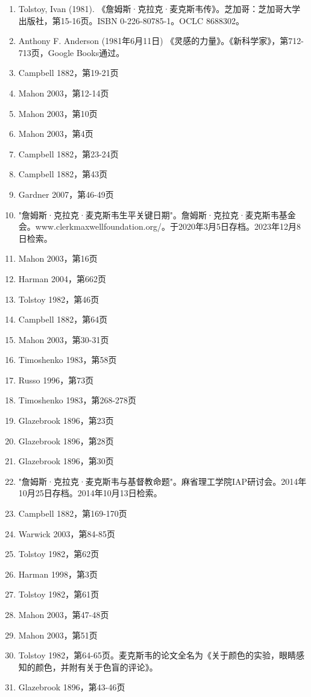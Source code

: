 \begin{enumerate}
\item Tolstoy, Ivan (1981). 《詹姆斯·克拉克·麦克斯韦传》。芝加哥：芝加哥大学出版社，第15-16页。ISBN 0-226-80785-1。OCLC 8688302。  
\item Anthony F. Anderson (1981年6月11日) 《灵感的力量》。《新科学家》，第712-713页，Google Books通过。  
\item Campbell 1882，第19-21页  
\item Mahon 2003，第12-14页  
\item Mahon 2003，第10页  
\item Mahon 2003，第4页  
\item Campbell 1882，第23-24页  
\item Campbell 1882，第43页  
\item Gardner 2007，第46-49页  
\item "詹姆斯·克拉克·麦克斯韦生平关键日期"。詹姆斯·克拉克·麦克斯韦基金会。www.clerkmaxwellfoundation.org/。于2020年3月5日存档。2023年12月8日检索。
\item Mahon 2003，第16页  
\item Harman 2004，第662页  
\item Tolstoy 1982，第46页  
\item Campbell 1882，第64页  
\item Mahon 2003，第30-31页  
\item Timoshenko 1983，第58页  
\item Russo 1996，第73页  
\item Timoshenko 1983，第268-278页  
\item Glazebrook 1896，第23页  
\item Glazebrook 1896，第28页  
\item Glazebrook 1896，第30页  
\item "詹姆斯·克拉克·麦克斯韦与基督教命题"。麻省理工学院IAP研讨会。2014年10月25日存档。2014年10月13日检索。
\item Campbell 1882，第169-170页  
\item Warwick 2003，第84-85页  
\item Tolstoy 1982，第62页  
\item Harman 1998，第3页  
\item Tolstoy 1982，第61页  
\item Mahon 2003，第47-48页  
\item Mahon 2003，第51页  
\item Tolstoy 1982，第64-65页。麦克斯韦的论文全名为《关于颜色的实验，眼睛感知的颜色，并附有关于色盲的评论》。  
\item Glazebrook 1896，第43-46页  

\end{enumerate}
